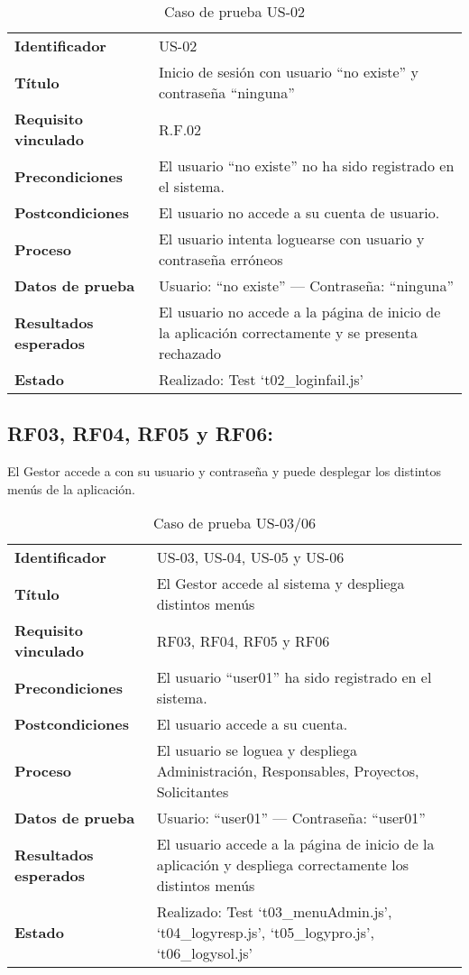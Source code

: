 \begin{table}[H]
	\centering
	\small
	\caption{Caso de prueba US-02}
	\label{tab:caso_us02}
	\begin{tabular}{>{\bfseries}l p{11cm}}
		Identificador & US-02 \\
		Título & Inicio de sesión con usuario “no existe” y contraseña “ninguna” \\
		Requisito vinculado & R.F.02 \\
		Precondiciones & El usuario “no existe” no ha sido registrado en el sistema. \\
		Postcondiciones & El usuario no accede a su cuenta de usuario. \\
		Proceso & El usuario intenta loguearse con usuario y contraseña erróneos \\
		Datos de prueba & Usuario: “no existe” — Contraseña: “ninguna” \\
		Resultados esperados & El usuario no accede a la página de inicio de la aplicación correctamente y se presenta rechazado \\
		Estado & Realizado: Test `t02\_loginfail.js' \\
	\end{tabular}
\end{table}

\subsection*{RF03, RF04, RF05 y RF06:} El Gestor accede a con su usuario y contraseña y puede desplegar los distintos menús de la aplicación.
\begin{table}[H]
	\centering
	\small
	\caption{Caso de prueba US-03/06}
	\label{tab:caso_us03}
	\begin{tabular}{>{\bfseries}l p{11cm}}
		Identificador & US-03, US-04, US-05 y US-06 \\
		Título & El Gestor accede al sistema y despliega distintos menús \\
		Requisito vinculado & RF03, RF04, RF05 y RF06 \\
		Precondiciones & El usuario “user01” ha sido registrado en el sistema. \\
		Postcondiciones & El usuario accede a su cuenta. \\
		Proceso & El usuario se loguea y despliega Administración, Responsables, Proyectos, Solicitantes \\
		Datos de prueba & Usuario: “user01” — Contraseña: “user01” \\
		Resultados esperados & El usuario accede a la página de inicio de la aplicación y despliega correctamente los distintos menús \\
		Estado & Realizado: Test `t03\_menuAdmin.js', `t04\_logyresp.js', `t05\_logypro.js', `t06\_logysol.js' \\
	\end{tabular}
\end{table}

